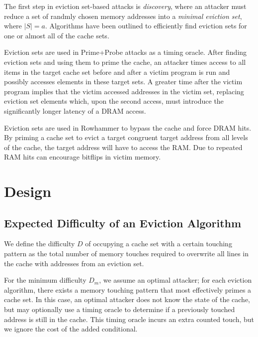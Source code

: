 \documentclass[sigconf, screen, review]{acmart}
\begin{document}
The first step in eviction set-based attacks is \textit{discovery},
where an attacker must reduce a set of randmly chosen memory addresses
into a \textit{minimal eviction set}, where $|S| = a$.
Algorithms have been outlined to efficiently find eviction sets for one or almost all
of the cache sets.



Eviction sets are used in Prime+Probe attacks as a timing oracle.
After finding eviction sets and using them to prime the cache,
an attacker times access to all items in the target cache set
before and after a victim program is run and possibly accesses elements in these target sets.
A greater time after the victim program implies that the victim accessed addresses in the victim set,
replacing eviction set elements which, upon the second access,
must introduce the significantly longer latency of a DRAM access.

Eviction sets are used in Rowhammer to bypass the cache and force DRAM hits.
By priming a cache set to evict a target congruent target address from all levels of the cache,
the target address will have to access the RAM.
Due to %
repeated RAM hits can encourage bitflips in victim memory.

\section{Design}

\subsection{Expected Difficulty of an Eviction Algorithm}

We define the difficulty $D$ of occupying a cache set with a certain touching pattern
as the total number of memory touches required to overwrite all lines in the cache
with addresses from an eviction set.

For the minimum difficulty $D_m$, we assume an optimal attacker;
for each eviction algorithm, there exists a memory touching pattern that
most effectively primes a cache set.
In this case, an optimal attacker does not know the state of the cache,
but may optionally use a timing oracle to determine if a previously touched address
is still in the cache.
This timing oracle incurs an extra counted touch, but we ignore the cost of
the added conditional.
\end{document}

